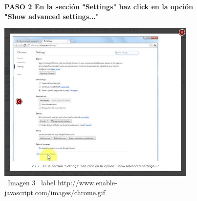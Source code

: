 \documentclass[11pt]{article} %
\begin{document}
\begin{figure}
\begin{center}
\begin{center}
\bf PASO 2
En la sección "Settings" haz click en la 
opción "Show advanced settings..."
\end{center}
\includegraphics[height=8cm, width=8 cm] {imagenes/chrome 02.jpg}
\newline
\  Imagen 3
\ label { http://www.enable-javascript.com/images/chrome.gif }
\newline



\end{center}
\end{figure}
\end{document}
